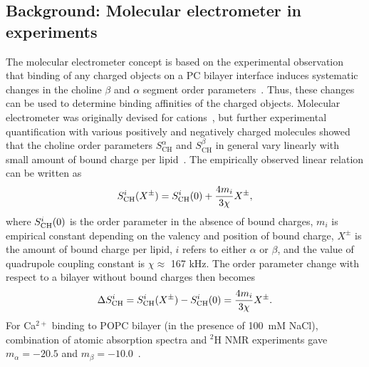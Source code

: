 \documentclass[twoside,twocolumn,9pt]{article}
\begin{document}
\subsection{Background: Molecular electrometer in experiments}\label{conceptinexperiments}
The molecular electrometer concept is based on the experimental observation that
binding of any charged objects on a PC bilayer interface induces systematic changes in the choline $\beta$ and $\alpha$
segment order parameters~\cite{akutsu81,altenbach84,altenbach85,seelig87,macdonald87,scherer89,roux90,beschiasvili91,marassi92,rydall92}.
Thus, these changes can be used to determine binding affinities of the charged objects.
Molecular electrometer was originally devised for cations~\cite{akutsu81,altenbach84}, but
further experimental quantification with various positively and negatively charged 
molecules showed that the choline order parameters $S_\mathrm{CH}^\alpha$ and $S_\mathrm{CH}^\beta$ 
in general vary linearly with small amount of bound charge per 
lipid~\cite{altenbach84,altenbach85,seelig87,macdonald87,scherer89,roux90,beschiasvili91,marassi92,rydall92}. 
The empirically observed linear relation can be written as~\cite{ferreira16}
\begin{equation}\label{electrometer_eq}
S_{\rm{CH}}^{i}(X^\pm)=S_{\rm{CH}}^{i}(0) + \frac{4m_i}{3\chi} X^\pm,
\end{equation}
where $S_{\rm{CH}}^{i}(0)$ is the order parameter in the absence of bound charges,
$m_i$ is empirical constant depending on the valency and position of bound charge,
$X^\pm$ is the amount of bound charge per lipid, 
$i$ refers to either $\alpha$ or $\beta$, and
the value of quadrupole coupling constant is $\chi \approx$ 167 kHz. 
The order parameter change with respect to a bilayer without bound charges then becomes
\begin{equation}\label{OPchangeEQ}
\Delta S_{\rm{CH}}^{i}= S_{\rm{CH}}^{i}(X^\pm)-S_{\rm{CH}}^{i}(0) =\frac{4m_i }{3\chi}X^\pm.
\end{equation}
For Ca$^{2+}$ binding to POPC bilayer (in the presence of 100~mM NaCl),
combination of atomic absorption spectra and $^2$H NMR experiments gave
$m_\alpha=-20.5$  and $m_\beta=-10.0$~\cite{altenbach84}.
\end{document}
